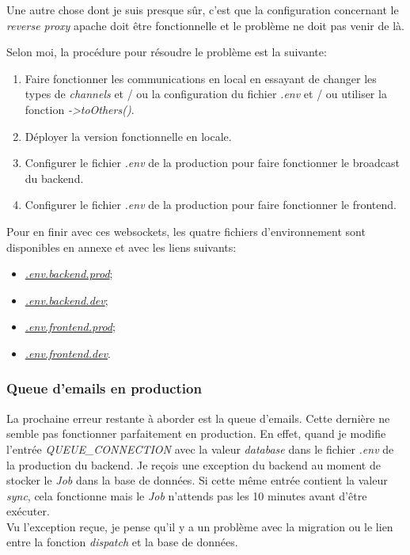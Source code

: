 \documentclass[
    iai, %
    il, %
]{heig-tb}
\begin{document}
Une autre chose dont je suis presque sûr, c'est que la configuration concernant le \emph{reverse proxy} \Gls{apache} doit être fonctionnelle et le problème ne doit pas venir de là.

Selon moi, la procédure pour résoudre le problème est la suivante:
\begin{enumerate}
    \item Faire fonctionner les communications en local en essayant de changer les types de \emph{channels} et / ou la configuration du fichier \emph{.env} et / ou utiliser la fonction \emph{->toOthers()}.
    \item Déployer la version fonctionnelle en locale.
    \item Configurer le fichier \emph{.env} de la production pour faire fonctionner le \Gls{broadcast} du \Gls{backend}.
    \item Configurer le fichier \emph{.env} de la production pour faire fonctionner le \Gls{frontend}.
\end{enumerate}

Pour en finir avec ces \Gls{websockets}, les quatre fichiers d'environnement sont disponibles en annexe et avec les liens suivants:
\begin{itemize}
    \item \href{https://github.com/heig-fablab/fablab-manager/blob/main/.env.prod.example}{\emph{.env.backend.prod}};
    \item \href{https://github.com/heig-fablab/fablab-manager/blob/main/.env.dev.example}{\emph{.env.backend.dev}};
    \item \href{https://github.com/heig-fablab/fablab-manager-frontend/blob/main/.env.prod.example}{\emph{.env.frontend.prod}};
    \item \href{https://github.com/heig-fablab/fablab-manager-frontend/blob/main/.env.dev.example}{\emph{.env.frontend.dev}}.
\end{itemize}

\subsubsection{Queue d'emails en production}
La prochaine erreur restante à aborder est la queue d'emails.
Cette dernière ne semble pas fonctionner parfaitement en production.
En effet, quand je modifie l'entrée \emph{QUEUE\_CONNECTION} avec la valeur \emph{database} dans le fichier \emph{.env} de la production du \Gls{backend}.
Je reçois une exception du \Gls{backend} au moment de stocker le \emph{Job} dans la base de données.
Si cette même entrée contient la valeur \emph{sync}, cela fonctionne mais le \emph{Job} n'attends pas les 10 minutes avant d'être exécuter. \\
Vu l'exception reçue, je pense qu'il y a un problème avec la migration ou le lien entre la fonction \emph{dispatch} et la base de données.
\end{document}
